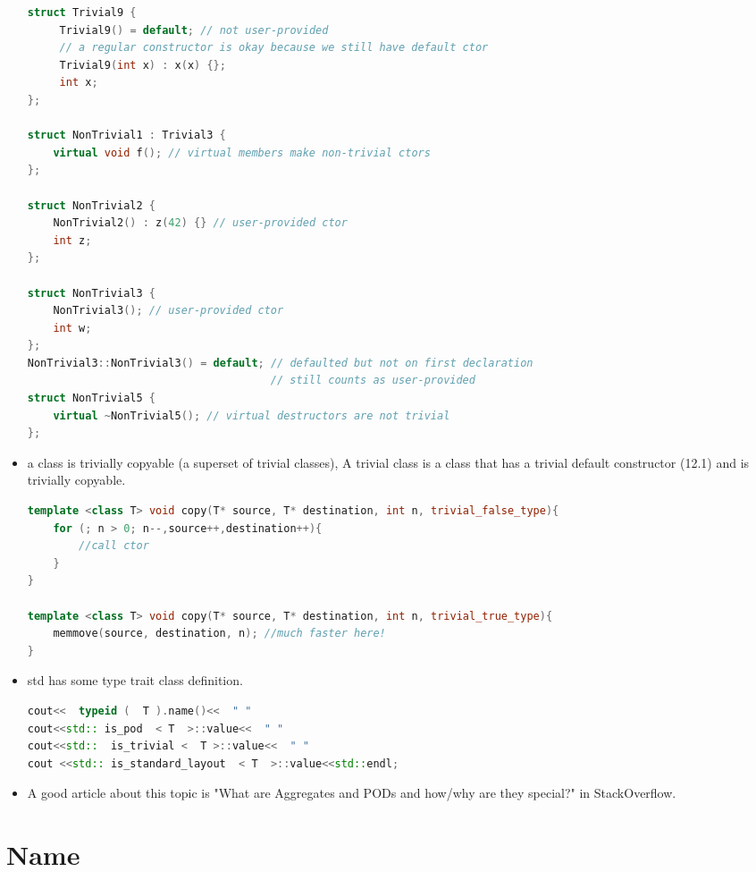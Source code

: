 \documentclass[a4paper,12pt,twoside]{book}
\begin{document}
\begin{itemize}
\begin{lstlisting}[frame=single, language=c++]
struct Trivial9 {
     Trivial9() = default; // not user-provided
     // a regular constructor is okay because we still have default ctor
     Trivial9(int x) : x(x) {};
     int x;
};

struct NonTrivial1 : Trivial3 {
    virtual void f(); // virtual members make non-trivial ctors
};

struct NonTrivial2 {
    NonTrivial2() : z(42) {} // user-provided ctor
    int z;
};

struct NonTrivial3 {
    NonTrivial3(); // user-provided ctor
    int w;
};
NonTrivial3::NonTrivial3() = default; // defaulted but not on first declaration
                                      // still counts as user-provided
struct NonTrivial5 {
    virtual ~NonTrivial5(); // virtual destructors are not trivial
};
\end{lstlisting}

\item a class is trivially copyable (a superset of trivial classes), A trivial class is a class that has a trivial default constructor (12.1) and is trivially copyable.



\begin{lstlisting}[frame=single, language=c++]
template <class T> void copy(T* source, T* destination, int n, trivial_false_type){
	for (; n > 0; n--,source++,destination++){
		//call ctor
	}
}

template <class T> void copy(T* source, T* destination, int n, trivial_true_type){
	memmove(source, destination, n); //much faster here!
}
\end{lstlisting}


\item std has some type trait class definition. 
\begin{lstlisting}[frame=single, language=c++]
cout<<  typeid (  T ).name()<<  " "  
cout<<std:: is_pod  < T  >::value<<  " " 
cout<<std::  is_trivial <  T >::value<<  " "  
cout <<std:: is_standard_layout  < T  >::value<<std::endl;
\end{lstlisting}

\item A good article about this topic is "What are Aggregates and PODs and how/why are they special?" in StackOverflow. 
\end{itemize}


\section{Name}
\end{document}
